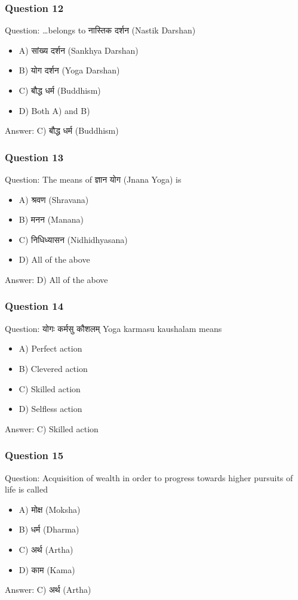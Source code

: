 \begin{frame}[fragile]\frametitle{Question 12}
Question: \ldots belongs to नास्तिक दर्शन (Nastik Darshan)
\begin{itemize}
\item A) सांख्य दर्शन (Sankhya Darshan)
\item B) योग दर्शन (Yoga Darshan)
\item C) बौद्ध धर्म (Buddhism)
\item D) Both A) and B)
\end{itemize}
Answer: C) बौद्ध धर्म (Buddhism)
\end{frame}

\begin{frame}[fragile]\frametitle{Question 13}
Question: The means of ज्ञान योग (Jnana Yoga) is
\begin{itemize}
\item A) श्रवण (Shravana)
\item B) मनन (Manana)
\item C) निधिध्यासन (Nidhidhyasana)
\item D) All of the above
\end{itemize}
Answer: D) All of the above
\end{frame}


\begin{frame}[fragile]\frametitle{Question 14}
Question: योगः कर्मसु कौशलम् Yoga karmasu kaushalam means
\begin{itemize}
\item A) Perfect action
\item B) Clevered action
\item C) Skilled action
\item D) Selfless action
\end{itemize}
Answer: C) Skilled action
\end{frame}
\begin{frame}[fragile]\frametitle{Question 15}
Question: Acquisition of wealth in order to progress towards higher pursuits of life is called
\begin{itemize}
\item A) मोक्ष (Moksha)
\item B) धर्म (Dharma)
\item C) अर्थ (Artha)
\item D) काम (Kama)
\end{itemize}
Answer: C) अर्थ (Artha)
\end{frame}

